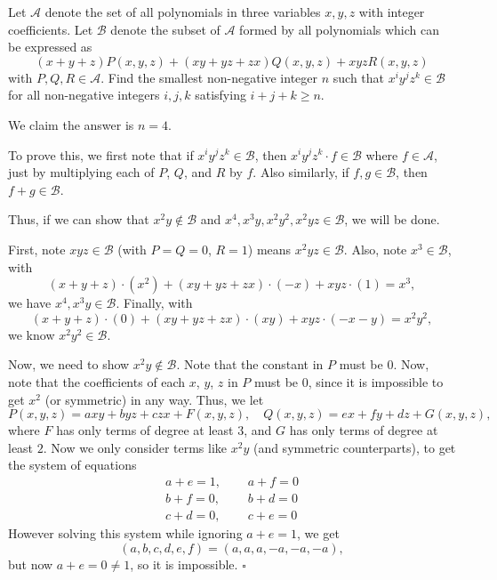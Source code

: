 
\begin{problem}[ISL 2020 A2]
    Let $\mathcal A$ denote the set of all polynomials in three variables $x, y, z$ with integer coefficients. Let $\mathcal B$ denote the subset of $\mathcal A$ formed by all polynomials which can be expressed as \[ (x+y+z)P(x,y,z) + (xy+yz+zx)Q(x,y,z) + xyzR(x,y,z) \] with $P,Q,R \in \mathcal A$.  Find the smallest non-negative integer $n$ such that $x^i y^j z^k \in \mathcal B$ for all non-negative integers $i, j, k$ satisfying $i + j + k \geq n$.
\end{problem}

\begin{solution}
    We claim the answer is $n = 4$.
    
    To prove this, we first note that if $x^iy^jz^k \in \mathcal B$, then $x^iy^jz^k \cdot f \in \mathcal B$ where $f \in \mathcal A$, just by multiplying each of $P$, $Q$, and $R$ by $f$. Also similarly, if $f, g \in \mathcal B$, then $f+g \in \mathcal B$.
    
    Thus, if we can show that $x^2y \not\in \mathcal B$ and $x^4, x^3y, x^2y^2, x^2yz \in \mathcal B$, we will be done.
    
    First, note $xyz \in \mathcal B$ (with $P = Q = 0$, $R = 1$) means $x^2yz \in \mathcal B$. Also, note $x^3 \in \mathcal B$, with \[(x+y+z) \cdot (x^2) + (xy+yz+zx) \cdot (-x) + xyz \cdot (1) = x^3,\] we have $x^4, x^3y \in \mathcal B$. Finally, with \[(x+y+z) \cdot (0) + (xy+yz+zx) \cdot (xy) + xyz \cdot (-x-y) = x^2y^2,\] we know $x^2y^2 \in \mathcal B$.
    
    Now, we need to show $x^2y \not\in \mathcal B$. Note that the constant in $P$ must be $0$. Now, note that the coefficients of each $x$, $y$, $z$ in $P$ must be $0$, since it is impossible to get $x^2$ (or symmetric) in any way. Thus, we let \[P(x,y,z) = axy + byz + czx + F(x,y,z), \quad Q(x,y,z) = ex + fy + dz + G(x,y,z),\] where $F$ has only terms of degree at least $3$, and $G$ has only terms of degree at least $2$. Now we only consider terms like $x^2y$ (and symmetric counterparts), to get the system of equations \begin{align*}
        a+e=1,~~~ & ~~~a+f=0\\
        b+f=0,~~~ & ~~~b+d=0\\
        c+d=0,~~~ & ~~~c+e=0
    \end{align*}
    However solving this system while ignoring $a+e=1$, we get \[(a,b,c,d,e,f) = (a,a,a,-a,-a,-a),\] but now $a+e=0\neq1$, so it is impossible. $\square$
\end{solution}
